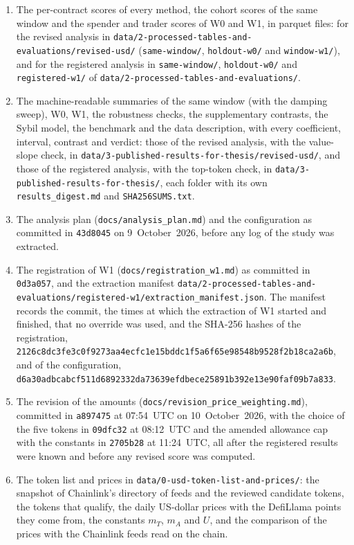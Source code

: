 \begin{enumerate}
\item The per-contract scores of every method, the cohort scores of the same window and the spender and trader scores of W0 and W1, in parquet files: for the revised analysis in \texttt{data/2-processed-tables-and-evaluations/revised-usd/} (\texttt{same-window/}, \texttt{holdout-w0/} and \texttt{window-w1/}), and for the registered analysis in \texttt{same-window/}, \texttt{holdout-w0/} and \texttt{registered-w1/} of \texttt{data/2-processed-tables-and-evaluations/}.
\item The machine-readable summaries of the same window (with the damping sweep), W0, W1, the robustness checks, the supplementary contrasts, the Sybil model, the benchmark and the data description, with every coefficient, interval, contrast and verdict: those of the revised analysis, with the value-slope check, in \texttt{data/3-published-results-for-thesis/revised-usd/}, and those of the registered analysis, with the top-token check, in \texttt{data/3-published-results-for-thesis/}, each folder with its own \texttt{results\_digest.md} and \texttt{SHA256SUMS.txt}.
\item The analysis plan (\texttt{docs/analysis\_plan.md}) and the configuration as committed in \texttt{43d8045} on 9~October~2026, before any log of the study was extracted.
\item The registration of W1 (\texttt{docs/registration\_w1.md}) as committed in \texttt{0d3a057}, and the extraction manifest \texttt{data/2-processed-tables-and-evaluations/registered-w1/extraction\_manifest.json}. The manifest records the commit, the times at which the extraction of W1 started and finished, that no override was used, and the SHA-256 hashes of the registration, \texttt{2126c8dc3fe3c0f9273aa4ecfc1e15bddc1f5a6f65e98548b9528f2b18ca2a6b}, and of the configuration, \texttt{d6a30adbcabcf511d6892332da73639efdbece25891b392e13e90faf09b7a833}.
\item The revision of the amounts (\texttt{docs/revision\_price\_weighting.md}), committed in \texttt{a897475} at 07:54~UTC on 10~October~2026, with the choice of the five tokens in \texttt{09dfc32} at 08:12~UTC and the amended allowance cap with the constants in \texttt{2705b28} at 11:24~UTC, all after the registered results were known and before any revised score was computed.
\item The token list and prices in \texttt{data/0-usd-token-list-and-prices/}: the snapshot of Chainlink's directory of feeds and the reviewed candidate tokens, the tokens that qualify, the daily US-dollar prices with the DefiLlama points they come from, the constants $m_T$, $m_A$ and $U$, and the comparison of the prices with the Chainlink feeds read on the chain.

\end{enumerate}
